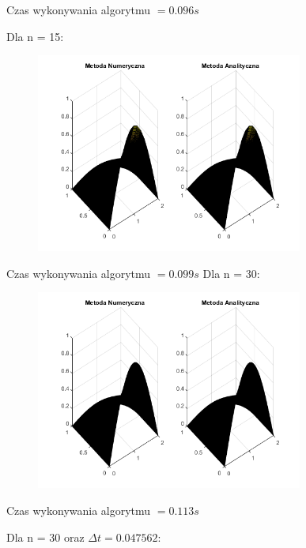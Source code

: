 Czas wykonywania algorytmu $ = 0.096 s$


Dla n = 15:

\begin{figure}[!ht]
	\begin{center}
		\includegraphics[width=0.78\textwidth]{Lab7/charts/df/15.png}
	\end{center}
\end{figure}

Czas wykonywania algorytmu $ = 0.099 s$
\newpage
Dla n = 30:

\begin{figure}[!ht]
	\begin{center}
		\includegraphics[width=0.78\textwidth]{Lab7/charts/df/30.png}
	\end{center}
\end{figure}

Czas wykonywania algorytmu $ = 0.113 s$

Dla n = 30 oraz $\Delta t = 0.047562$:


